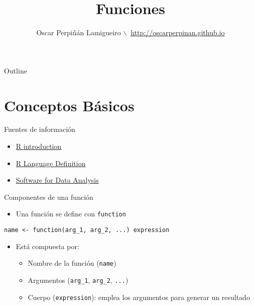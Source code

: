 \documentclass[xcolor={usenames,svgnames,dvipsnames}]{beamer}
\author{Oscar Perpiñán Lamigueiro $\backslash$\ \url{http://oscarperpinan.github.io}}
\date{}
\title{Funciones}
\begin{document}
\maketitle
\begin{frame}{Outline}
\tableofcontents
\end{frame}



\section{Conceptos Básicos}
\label{sec:orgheadline13}

\begin{frame}[label={sec:orgheadline1}]{Fuentes de información}
\begin{itemize}
\item \href{http://cran.r-project.org/doc/manuals/R-intro.html}{R introduction}
\item \href{http://cran.r-project.org/doc/manuals/R-lang.html}{R Language Definition}
\item \href{http://www.springer.com/gb/book/9780387759357}{Software for Data Analysis}
\end{itemize}
\end{frame}
\begin{frame}[fragile,label={sec:orgheadline2}]{Componentes de una función}
 \begin{itemize}
\item Una función se define con \texttt{function}
\end{itemize}
\begin{center}
\texttt{name <- function(arg\_1, arg\_2, ...) expression}
\end{center}
\begin{itemize}
\item Está compuesta por:
\begin{itemize}
\item Nombre de la función (\texttt{name})
\item Argumentos (\texttt{arg\_1}, \texttt{arg\_2}, \texttt{...})
\item Cuerpo (\texttt{expression}): emplea los argumentos para generar un resultado
\end{itemize}
\end{itemize}
\end{frame}
\end{document}
